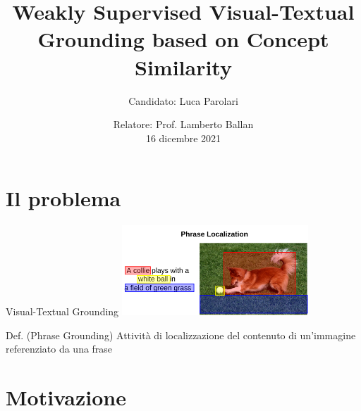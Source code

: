 \documentclass{beamer}
\title{Weakly Supervised Visual-Textual Grounding based on Concept Similarity}
\author{Candidato: Luca Parolari}
\date{Relatore: Prof. Lamberto Ballan \\ \vspace{0.2cm} \small 16 dicembre 2021}
\begin{document}
\maketitle


\section{Il problema}

\begin{frame}{Visual-Textual Grounding}
  \centering
  \includegraphics[width=7cm]{images/dog-playing-with-ball.png}

  \vspace{0.5cm}

  \begin{alertblock}{Def. (Phrase Grounding)}
    Attività di localizzazione del contenuto di un'immagine referenziato da una
    frase
  \end{alertblock}
\end{frame}

\section{Motivazione}
\end{document}

